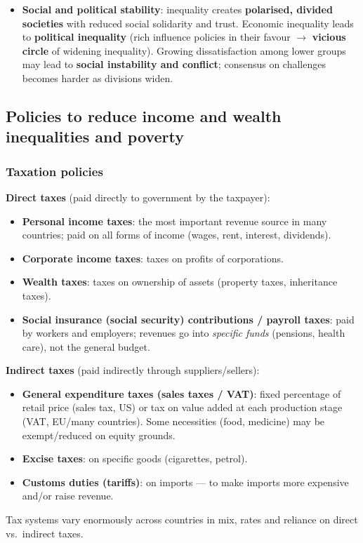 \documentclass[a4paper,12pt]{article}
\begin{document}
\begin{itemize}
\begin{itemize}
    \item \textbf{Social problems}: crime, drug use, family breakdowns, homelessness.
    \item \textbf{Inability to realise full potential} $\to$ waste of human talent $\to$ lower growth (PPC/LRAS shift less).
  \end{itemize}
  \item \textbf{Social and political stability}: inequality creates \textbf{polarised, divided societies} with reduced social solidarity and trust. Economic inequality leads to \textbf{political inequality} (rich influence policies in their favour $\to$ \textbf{vicious circle} of widening inequality). Growing dissatisfaction among lower groups may lead to \textbf{social instability and conflict}; consensus on challenges becomes harder as divisions widen.
\end{itemize}
\subsection{Policies to reduce income and wealth inequalities and poverty}
\subsubsection*{Taxation policies}
\textbf{Direct taxes} (paid directly to government by the taxpayer):
\begin{itemize}
  \item \textbf{Personal income taxes}: the most important revenue source in many countries; paid on all forms of income (wages, rent, interest, dividends).
  \item \textbf{Corporate income taxes}: taxes on profits of corporations.
  \item \textbf{Wealth taxes}: taxes on ownership of assets (property taxes, inheritance taxes).
  \item \textbf{Social insurance (social security) contributions / payroll taxes}: paid by workers and employers; revenues go into \textit{specific funds} (pensions, health care), not the general budget.
\end{itemize}
\textbf{Indirect taxes} (paid indirectly through suppliers/sellers):
\begin{itemize}
  \item \textbf{General expenditure taxes (sales taxes / VAT)}: fixed percentage of retail price (sales tax, US) or tax on value added at each production stage (VAT, EU/many countries). Some necessities (food, medicine) may be exempt/reduced on equity grounds.
  \item \textbf{Excise taxes}: on specific goods (cigarettes, petrol).
  \item \textbf{Customs duties (tariffs)}: on imports --- to make imports more expensive and/or raise revenue.
\end{itemize}
Tax systems vary enormously across countries in mix, rates and reliance on direct vs.\ indirect taxes.
\end{document}

